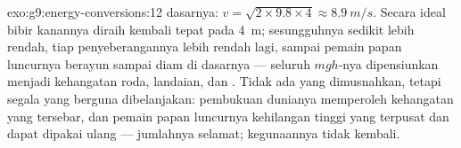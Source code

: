 \begin{solution}{exo:g9:energy-conversions:12}
 dasarnya: $v = \sqrt{2 \times 9.8 \times 4} \approx
\qty{8.9}{m/s}$. Secara ideal bibir kanannya diraih kembali tepat pada
\qty{4}{m}; sesungguhnya sedikit lebih rendah, tiap penyeberangannya
lebih rendah lagi, sampai pemain papan luncurnya berayun sampai diam
di dasarnya --- seluruh $m g h$-nya dipensiunkan menjadi kehangatan
roda, landaian, dan . Tidak ada yang dimusnahkan, tetapi
segala yang berguna dibelanjakan: pembukuan dunianya memperoleh
kehangatan yang tersebar, dan pemain papan luncurnya kehilangan tinggi
yang terpusat dan dapat dipakai ulang --- jumlahnya selamat;
kegunaannya tidak kembali.
\end{solution}

